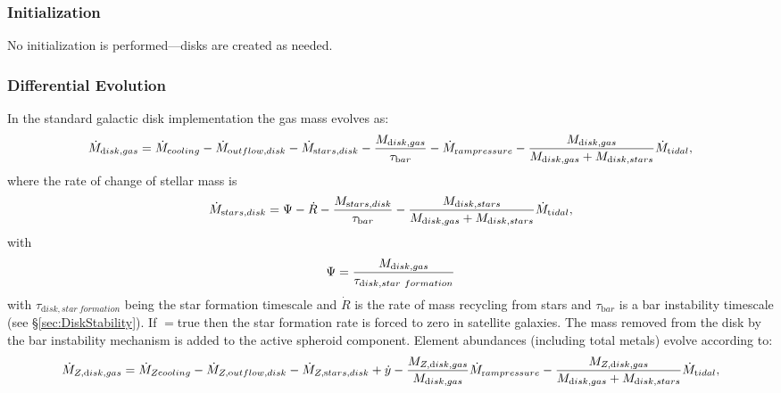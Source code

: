 \subsubsection{Initialization}

No initialization is performed---disks are created as needed.

\subsubsection{Differential Evolution}

In the standard galactic disk implementation the gas mass evolves as:
\begin{equation}
 \dot{M}_{\mathrm disk, gas} = \dot{M}_{\mathrm cooling} - \dot{M}_{\mathrm outflow, disk} - \dot{M}_{\mathrm stars, disk} - {M_{\mathrm disk, gas}\over \tau_{\mathrm bar}} - \dot{M}_{\mathrm ram pressure} - {M_{\mathrm disk, gas} \over M_{\mathrm disk, gas} + M_{\mathrm disk, stars}} \dot{M}_{\mathrm tidal},
\end{equation}
where the rate of change of stellar mass is
\begin{equation}
 \dot{M}_{\mathrm stars, disk} = \Psi - \dot{R} - {M_{\mathrm stars,disk} \over \tau_{\mathrm bar}} - {M_{\mathrm disk, stars} \over M_{\mathrm disk, gas} + M_{\mathrm disk, stars}} \dot{M}_{\mathrm tidal},
\end{equation}
with
\begin{equation}
 \Psi = {M_{\mathrm disk, gas} \over \tau_{\mathrm disk, star~formation}}
\end{equation}
with $\tau_{\mathrm disk, star~formation}$ being the star formation timescale and $\dot{R}$ is the rate of mass recycling from stars and $\tau_{\mathrm bar}$ is a bar instability timescale (see \S\ref{sec:DiskStability}). If {\normalfont \ttfamily [diskStarFormationInSatellites]}$=${\normalfont \ttfamily true} then the star formation rate is forced to zero in satellite galaxies. The mass removed from the disk by the bar instability mechanism is added to the active spheroid component.
Element abundances (including total metals) evolve according to:
\begin{equation}
  \dot{M}_{Z, {\mathrm disk, gas}} = \dot{M}_{Z {\mathrm cooling}} - \dot{M}_{Z, {\mathrm outflow, disk}} - \dot{M}_{Z, {\mathrm stars, disk}} + \dot{y} - {M_{Z, {\mathrm disk, gas}} \over M_{\mathrm disk, gas}} \dot{M}_{\mathrm ram pressure} - {M_{Z, {\mathrm disk, gas}} \over M_{\mathrm disk, gas} + M_{\mathrm disk, stars}} \dot{M}_{\mathrm tidal},
\end{equation}
